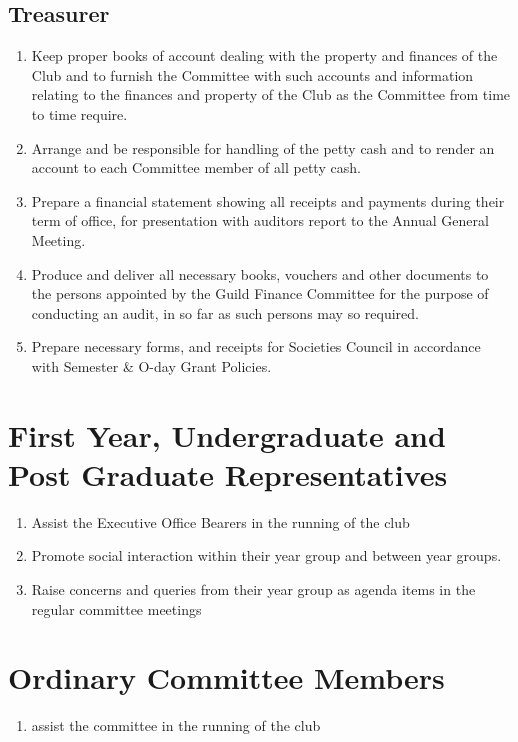 \documentclass[10pt,a4paper]{report}
\begin{document}
		\subsection{Treasurer}
			\begin{enumerate}[label=\alph*]
				\item Keep proper books of account dealing with the property and finances of the Club and to furnish the Committee with such accounts and information relating to the finances and property of the Club as the Committee from time to time require.
				\item Arrange and be responsible for handling of the petty cash and to render an account to each Committee member of all petty cash.
				\item Prepare a financial statement showing all receipts and payments during their term of office, for presentation with auditors report to the Annual General Meeting.
				\item Produce and deliver all necessary books, vouchers and other documents to the persons appointed by the Guild Finance Committee for the purpose of conducting an audit, in so far as such persons may so required.
				\item Prepare necessary forms, and receipts for Societies Council in accordance with Semester \& O-day Grant Policies.
			\end{enumerate}
		\section{First Year, Undergraduate and Post Graduate Representatives}
			\begin{enumerate}[label=\alph*]
				\item Assist the Executive Office Bearers in the running of the club
				\item Promote social interaction within their year group and between year groups.
				\item Raise concerns and queries from their year group as agenda items in the regular committee meetings
			\end{enumerate}
		\section{Ordinary Committee Members}
			\begin{enumerate}[label=\alph*]
				\item assist the committee in the running of the club
			\end{enumerate}
\end{document}
